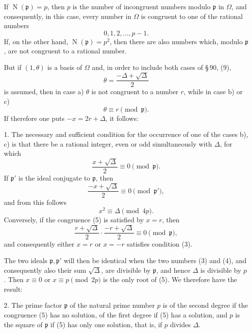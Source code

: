 \documentclass[11pt]{article}
\newcommand{\Norm}{\operatorname{N}}
\begin{document}
If $\Norm(\mathfrak p)=p$, then $p$ is the number of incongruent numbers modulo $\mathfrak p$ in $\Omega$, and consequently, in this case, every number in $\Omega$ is congruent to one of the rational numbers
\begin{equation}
0,1,2,\ldots,p-1.
\tag{1}
\end{equation}
If, on the other hand, $\Norm(\mathfrak p)=p^2$, then there are also numbers which, modulo $\mathfrak p$, are not congruent to a rational number.

But if $(1,\theta)$ is a basis of $\Omega$ and, in order to include both cases of \S\,90, (9),
\begin{equation}
 \theta=\frac{-\Delta+\sqrt\Delta}{2}
\tag{2}
\end{equation}
is assumed, then in case a) $\theta$ is not congruent to a number $r$, while in case b) or c)
\[
 \theta\equiv r\pmod{\mathfrak p}.
\]
If therefore one puts $-x=2r+\Delta$, it follows:

1. The necessary and sufficient condition for the occurrence of one of the cases b), c) is that there be a rational integer, even or odd simultaneously with $\Delta$, for which
\begin{equation}
 \frac{x+\sqrt\Delta}{2}\equiv0\pmod{\mathfrak p}.
\tag{3}
\end{equation}
If $\mathfrak p'$ is the ideal conjugate to $\mathfrak p$, then
\begin{equation}
 \frac{-x+\sqrt\Delta}{2}\equiv0\pmod{\mathfrak p'},
\tag{4}
\end{equation}
and from this follows
\begin{equation}
 x^2\equiv\Delta\pmod{4p}.
\tag{5}
\end{equation}
Conversely, if the congruence (5) is satisfied by $x=r$, then
\[
 \frac{r+\sqrt\Delta}{2}\cdot\frac{-r+\sqrt\Delta}{2}\equiv0\pmod{\mathfrak p},
\]
and consequently either $x=r$ or $x=-r$ satisfies condition (3).

The two ideals $\mathfrak p,\mathfrak p'$ will then be identical when the two numbers (3) and (4), and consequently also their sum $\sqrt\Delta$, are divisible by $\mathfrak p$, and hence $\Delta$ is divisible by $p$. Then $x\equiv0$ or $x\equiv p\pmod{2p}$ is the only root of (5). We therefore have the result:

2. The prime factor $\mathfrak p$ of the natural prime number $p$ is of the second degree if the congruence (5) has no solution, of the first degree if (5) has a solution, and $p$ is the square of $\mathfrak p$ if (5) has only one solution, that is, if $p$ divides $\Delta$.
\end{document}
